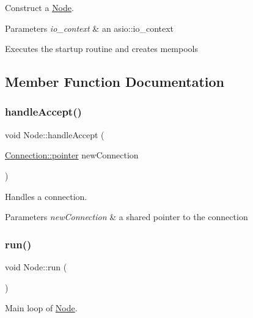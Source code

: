 Construct a \mbox{\hyperlink{classNode}{Node}}. 


\begin{DoxyParams}{Parameters}
{\em io\+\_\+context} & an asio\+::io\+\_\+context\\
\hline
\end{DoxyParams}
Executes the startup routine and creates mempools 

\subsection{Member Function Documentation}
\mbox{\label{classNode_a7955793e35a52f192e7e5f82dd541092}} 
\subsubsection{\texorpdfstring{handle\+Accept()}{handleAccept()}}
{\footnotesize\ttfamily void Node\+::handle\+Accept (\begin{DoxyParamCaption}\item[{\mbox{\hyperlink{classConnection_a1bb6cd8924ff091e9b053e3368735c9c}{Connection\+::pointer}}}]{new\+Connection }\end{DoxyParamCaption})\hspace{0.3cm}{\ttfamily [private]}}



Handles a connection. 


\begin{DoxyParams}{Parameters}
{\em new\+Connection} & a shared pointer to the connection \\
\hline
\end{DoxyParams}
\mbox{\label{classNode_a89bb61a94d73680b692280d83e83d2f4}} 
\subsubsection{\texorpdfstring{run()}{run()}}
{\footnotesize\ttfamily void Node\+::run (\begin{DoxyParamCaption}{ }\end{DoxyParamCaption})}



Main loop of \mbox{\hyperlink{classNode}{Node}}. 



